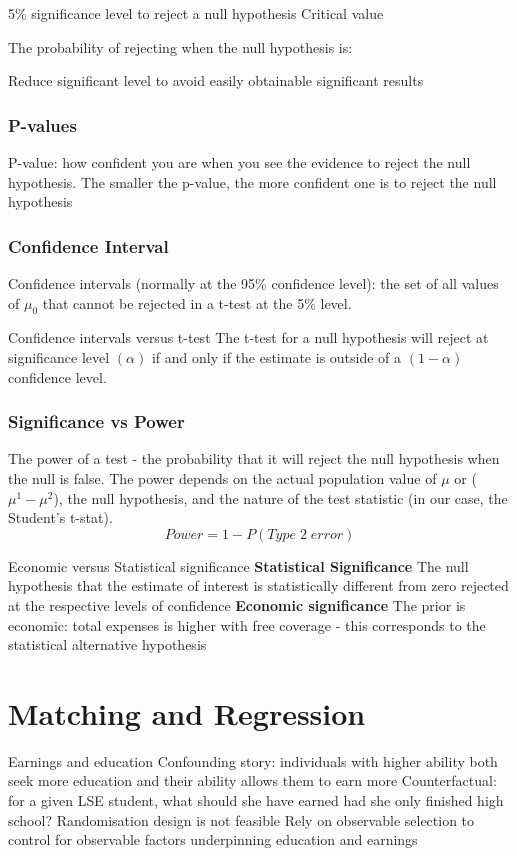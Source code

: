 \documentclass[12pt, letterpaper]{article}
\begin{document}
{5\% significance level to reject a null hypothesis
Critical value

The probability of rejecting when the null hypothesis is:

Reduce significant level to avoid easily obtainable significant results

\subsubsection{P-values}
P-value: how confident you are when you see the evidence to reject the null hypothesis. 
The smaller the p-value, the more confident one is to reject the null hypothesis


\subsubsection{Confidence Interval}
Confidence intervals (normally at the 95\% confidence level): the set of all values of $\mu_0$ that cannot be rejected in a t-test at the 5\% level.

Confidence intervals versus t-test 
The t-test for a null hypothesis will reject at significance level $(\alpha)$ if and only if the estimate is outside of a $(1-\alpha)$ confidence level.

\subsubsection{Significance vs Power}
The power of a test - the probability that it will reject the null hypothesis when the null is false. The power depends on the actual population value of $\mu$ or ($\mu^1 - \mu^2$), the null hypothesis, and the nature of the test statistic (in our case, the Student's t-stat). $$Power = 1-P(Type\; 2\; error)$$

Economic versus Statistical significance
\textbf{Statistical Significance}
The null hypothesis that the estimate of interest is statistically different from zero rejected at the respective levels of confidence
\textbf{Economic significance}
The prior is economic: total expenses is higher with free coverage - this corresponds to the statistical alternative hypothesis

\section{Matching and Regression}
Earnings and education
Confounding story: individuals with higher ability both seek more education and their ability allows them to earn more
Counterfactual: for a given LSE student, what should she have earned had she only finished high school?
Randomisation design is not feasible
Rely on observable selection to control for observable factors underpinning education and earnings

}
\end{document}
